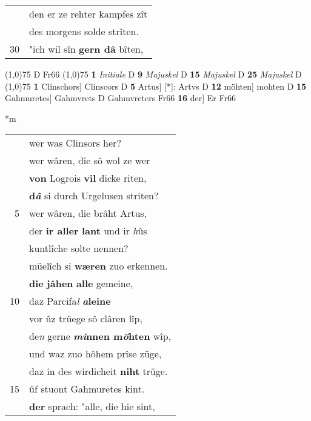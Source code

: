 \documentclass[8pt,a4paper,notitlepage]{article}
\begin{document}
\begin{table}[ht]
\begin{minipage}[t]{0.5\linewidth}
\begin{tabular}{rl}
 & den er ze rehter kampfes zît\\ 
 & des morgens solde strîten.\\ 
30 & "ich wil sîn \textbf{gern dâ} bîten,\\ 
\end{tabular}
\scriptsize
\line(1,0){75} \newline
D Fr66 \newline
\line(1,0){75} \newline
\textbf{1} \textit{Initiale} D  \textbf{9} \textit{Majuskel} D  \textbf{15} \textit{Majuskel} D  \textbf{25} \textit{Majuskel} D  \newline
\line(1,0){75} \newline
\textbf{1} Clinschors] Clinscors D \textbf{5} Artus] [*]: Artvs D \textbf{12} möhten] mohten D \textbf{15} Gahmuretes] Gahmvrets D Gahmvreters Fr66 \textbf{16} der] Er Fr66 \newline
\end{minipage}
\hspace{0.5cm}
\begin{minipage}[t]{0.5\linewidth}
\small
\begin{center}*m
\end{center}
\begin{tabular}{rl}
 & wer was Clinsors her?\\ 
 & wer wâren, die sô wol ze wer\\ 
 & \textbf{von} Logrois \textbf{vil} dicke riten,\\ 
 & \textbf{d\textit{â}} si durch Urgelusen striten?\\ 
5 & wer wâren, die brâht Artus,\\ 
 & der \textbf{ir aller} \textbf{lant} und ir \textit{h}ûs\\ 
 & kuntlîche solte nennen?\\ 
 & müelîch si \textbf{wæren} zuo erkennen.\\ 
 & \textbf{die} \textbf{jâhen} \textbf{alle} gemeine,\\ 
10 & daz Parcifa\textit{l} \textbf{\textit{a}leine}\\ 
 & vor ûz trüege sô clâren lîp,\\ 
 & de\textit{n} gerne \textbf{\textit{mi}nnen m\textit{ö}hten} wîp,\\ 
 & und waz zuo hôhem prîse züge,\\ 
 & daz in des wirdicheit \textbf{niht} trüge.\\ 
15 & ûf stuont Gahmuretes kint.\\ 
 & \textbf{der} sprach: "alle, die hie sint,\\ 

\end{tabular}
\end{minipage}
\end{table}
\end{document}
